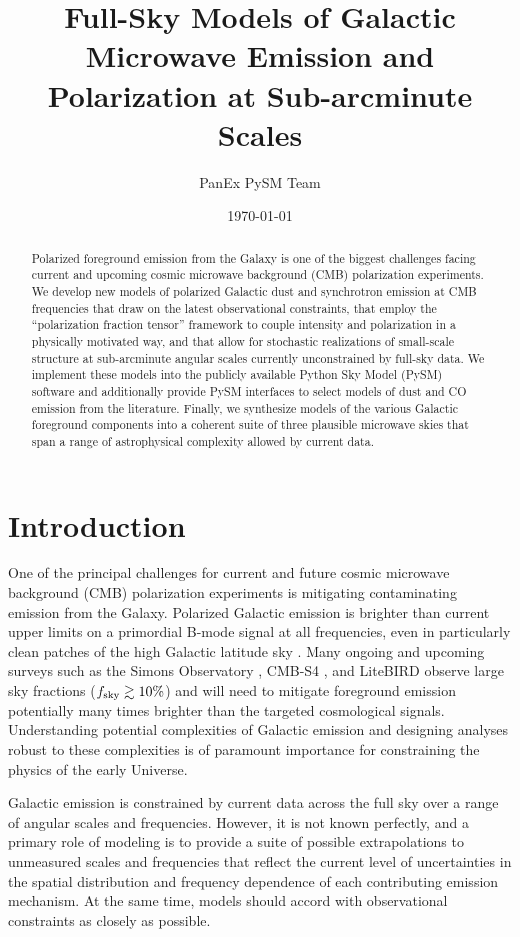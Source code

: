 \documentclass[twocolumn]{aastex631}
\begin{document}
\title{Full-Sky Models of Galactic Microwave Emission and Polarization at Sub-arcminute Scales}
\author{PanEx PySM Team}
\date{\today}

\begin{abstract}
Polarized foreground emission from the Galaxy is one of the biggest challenges facing current and upcoming cosmic microwave background (CMB) polarization experiments. We develop new models of polarized Galactic dust and synchrotron emission at CMB frequencies that draw on the latest observational constraints, that employ the ``polarization fraction tensor'' framework to couple intensity and polarization in a physically motivated way, and that allow for stochastic realizations of small-scale structure at sub-arcminute angular scales currently unconstrained by full-sky data. We implement these models into the publicly available Python Sky Model (PySM) software and additionally provide PySM interfaces to select models of dust and CO emission from the literature. Finally, we synthesize models of the various Galactic foreground components into a coherent suite of three plausible microwave skies that span a range of astrophysical complexity allowed by current data.
\end{abstract}

\section{Introduction}
One of the principal challenges for current and future cosmic microwave background (CMB) polarization experiments is mitigating contaminating emission from the Galaxy. Polarized Galactic emission is brighter than current upper limits on a primordial B-mode signal at all frequencies, even in particularly clean patches of the high Galactic latitude sky \citep{planck2016-l11A}. Many ongoing and upcoming surveys such as the Simons Observatory \citep{Ade:2019}, CMB-S4 \citep{Abazajian:2022}, and LiteBIRD \citep{LiteBIRDCollaboration:2023} observe large sky fractions ($f_{\rm sky} \gtrsim 10\%$) and will need to mitigate foreground emission potentially many times brighter than the targeted cosmological signals. Understanding potential complexities of Galactic emission and designing analyses robust to these complexities is of paramount importance for constraining the physics of the early Universe.

Galactic emission is constrained by current data across the full sky over a range of angular scales and frequencies. However, it is not known perfectly, and a primary role of modeling is to provide a suite of possible extrapolations to unmeasured scales and frequencies that reflect the current level of uncertainties in the spatial distribution and frequency dependence of each contributing emission mechanism. At the same time, models should accord with observational constraints as closely as possible.
\end{document}
